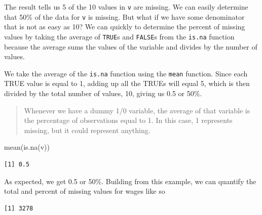 \documentclass[
]{book}
\makeatletter
\newenvironment{Shaded}{\begin{snugshade}}{\end{snugshade}}
\newcommand{\FunctionTok}[1]{\textcolor[rgb]{0,0,0}{#1}}
\newcommand{\NormalTok}[1]{#1}
\newcommand{\SpecialCharTok}[1]{\textcolor[rgb]{0,0,0}{#1}}
\newenvironment{kframe}{%
\medskip{}
\setlength{\fboxsep}{.8em}
 \def\at@end@of@kframe{}%
 \ifinner\ifhmode%
  \def\at@end@of@kframe{\end{minipage}}%
  \begin{minipage}{\columnwidth}%
 \fi\fi%
 \def\FrameCommand##1{\hskip\@totalleftmargin \hskip-\fboxsep
 \colorbox{shadecolor}{##1}\hskip-\fboxsep
     \hskip-\linewidth \hskip-\@totalleftmargin \hskip\columnwidth}%
 \MakeFramed {\advance\hsize-\width
   \@totalleftmargin\z@ \linewidth\hsize
   \@setminipage}}%
 {\par\unskip\endMakeFramed%
 \at@end@of@kframe}
\renewenvironment{Shaded}{\begin{kframe}}{\end{kframe}}
\makeatother
\begin{document}
The result tells us 5 of the 10 values in \texttt{v} are missing. We can easily determine that 50\% of the data for \texttt{v} is missing. But what if we have some denominator that is not as easy as 10? We can quickly to determine the percent of missing values by taking the average of \texttt{TRUE}s and \texttt{FALSE}s from the \texttt{is.na} function because the average sums the values of the variable and divides by the number of values.

We take the average of the \texttt{is.na} function using the \texttt{mean} function. Since each TRUE value is equal to 1, adding up all the TRUEs will equal 5, which is then divided by the total number of values, 10, giving us 0.5 or 50\%.

\begin{quote}
Whenever we have a dummy 1/0 variable, the average of that variable is the percentage of observations equal to 1. In this case, 1 represents missing, but it could represent anything.
\end{quote}

\begin{Shaded}
\begin{Highlighting}[]
\FunctionTok{mean}\NormalTok{(}\FunctionTok{is.na}\NormalTok{(v))}
\end{Highlighting}
\end{Shaded}

\begin{verbatim}
[1] 0.5
\end{verbatim}

As expected, we get 0.5 or 50\%. Building from this example, we can quantify the total and percent of missing values for wages like so

\begin{Shaded}
\end{Shaded}

\begin{verbatim}
[1] 3278
\end{verbatim}

\begin{Shaded}
\end{Shaded}
\end{document}
